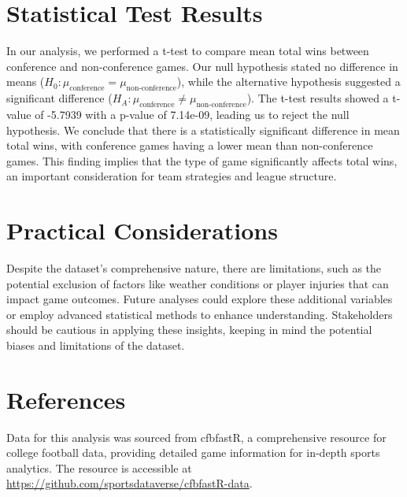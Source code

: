 \documentclass{article}
\begin{document}
\section*{Statistical Test Results}
In our analysis, we performed a t-test to compare mean total wins between conference and non-conference games. Our null hypothesis stated no difference in means (\(H_0: \mu_{\text{conference}} = \mu_{\text{non-conference}}\)), while the alternative hypothesis suggested a significant difference (\(H_A: \mu_{\text{conference}} \neq \mu_{\text{non-conference}}\)). The t-test results showed a t-value of -5.7939 with a p-value of 7.14e-09, leading us to reject the null hypothesis. We conclude that there is a statistically significant difference in mean total wins, with conference games having a lower mean than non-conference games. This finding implies that the type of game significantly affects total wins, an important consideration for team strategies and league structure.

\section*{Practical Considerations}
Despite the dataset's comprehensive nature, there are limitations, such as the potential exclusion of factors like weather conditions or player injuries that can impact game outcomes. Future analyses could explore these additional variables or employ advanced statistical methods to enhance understanding. Stakeholders should be cautious in applying these insights, keeping in mind the potential biases and limitations of the dataset.

\section*{References}
Data for this analysis was sourced from cfbfastR, a comprehensive resource for college football data, providing detailed game information for in-depth sports analytics. The resource is accessible at \url{https://github.com/sportsdataverse/cfbfastR-data}.
\end{document}

